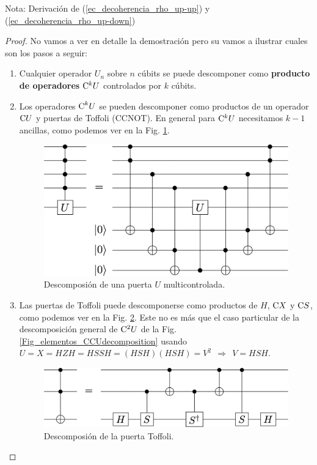\documentclass[a4paper,11pt]{book} %
\numberwithin{equation}{chapter}
\newcommand{\cg}[1]{{\rm C}#1}
\begin{document}
\begin{mybox_blue}{Nota: Derivación de (\ref{ec_decoherencia_rho_up-up}) y  (\ref{ec_decoherencia_rho_up-down})}
	\begin{proof}
	No vamos a ver en detalle la demostración pero su vamos a ilustrar cuales son los pasos a seguir:
	\begin{enumerate}
		\item Cualquier operador $U_n$ sobre $n$ cúbits se puede descomponer como \textbf{producto de operadores} $\cg{^kU}$ 
		controlados por $k$ cúbits.
		
		\item Los operadores $\hbox{C}^kU$ se pueden descomponer como productos de un  operador $\cg{U}$ y puertas de Toffoli (CCNOT).
		En general para $\cg{^kU}$ necesitamos $k-1$ ancillas, como podemos ver en la Fig. \ref{Fig_universal_CkUdecomposition}.
			\begin{figure}[H]
			\centering 
			\includegraphics[width=0.65\linewidth]{Figuras/Fig_universal_CkUdecomposition}
			\caption{Descomposión de una puerta $U$ multicontrolada.}
			\label{Fig_universal_CkUdecomposition}
			\end{figure}


		\item Las puertas de Toffoli puede descomponerse como productos de $H$, $\cg{X}$ y $\cg{S}$, como podemos ver en la 
		Fig. \ref{Fig_universal_Toffolidecomposition}. Este no es más que el caso particular  de la descomposición general 
		de $\cg{^2U}$ de la Fig. \ref{Fig_elementos_CCUdecomposition} usando 
		$U = X = HZH=HSSH =  (HSH)(HSH)= V^2 ~~\Rightarrow ~~V = HSH$.
			\begin{figure}[H]
			\centering 
			\includegraphics[width=0.65\linewidth]{Figuras/Fig_universal_Toffolidecomposition}
			\caption{Descomposión de la puerta Toffoli.}
			\label{Fig_universal_Toffolidecomposition}
			\end{figure}


\end{enumerate}
\end{proof}
\end{mybox_blue}
\end{document}

